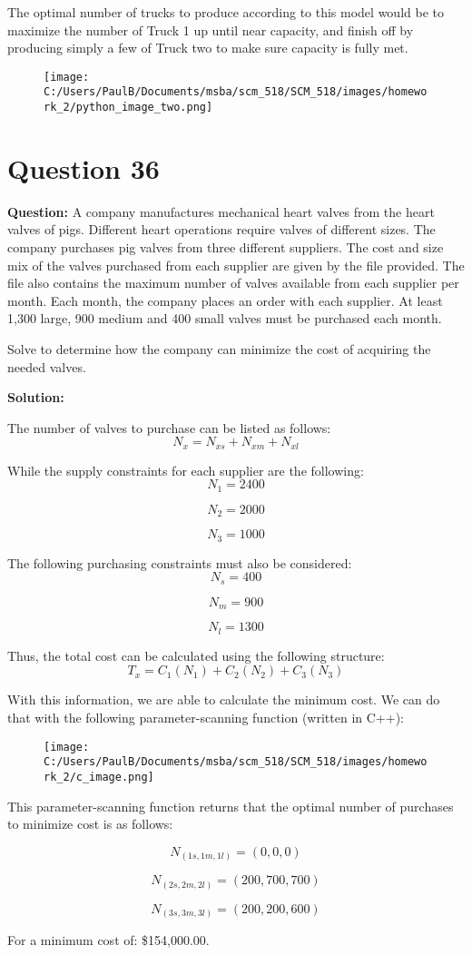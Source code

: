 \documentclass[notitlepage]{report}
\begin{document}
The optimal number of trucks to produce according to this model would be to maximize the number of Truck 1 up until near capacity, and finish off by producing simply a few of Truck two to make sure capacity is fully met.

\begin{figure}[H]
	\centering
	\texttt{[image: C:/Users/PaulB/Documents/msba/scm\_518/SCM\_518/images/homework\_2/python\_image\_two.png]}
\end{figure}

\section*{Question 36}
\textbf{Question:} A company manufactures mechanical heart valves from the heart valves of pigs. Different heart operations require valves of different sizes. The company purchases pig valves from three different suppliers. The cost and size mix of the valves purchased from each supplier are given by the file provided. The file also contains the maximum number of valves available from each supplier per month. Each month, the company places an order with each supplier. At least 1,300 large, 900 medium and 400 small valves must be purchased each month.

Solve to determine how the company can minimize the cost of acquiring the needed valves.

\textbf{Solution:}

The number of valves to purchase can be listed as follows:
$$
N_{x} = N_{xs}+N_{xm}+N_{xl}
$$

While the supply constraints for each supplier are the following:
$$
N_{1} = 2400
$$

$$
N_{2} = 2000
$$

$$
N_{3} = 1000
$$

The following purchasing constraints must also be considered:
$$
N_{s} = 400
$$

$$
N_{m} = 900
$$

$$
N_{l} = 1300
$$

Thus, the total cost can be calculated using the following structure:
$$
T_{x} = C_{1} (N_{1}) + C_{2} (N_{2}) + C_{3} (N_{3})
$$

With this information, we are able to calculate the minimum cost. We can do that with the following parameter-scanning function (written in C++):

\begin{figure}[H]
	\centering
	\texttt{[image: C:/Users/PaulB/Documents/msba/scm\_518/SCM\_518/images/homework\_2/c\_image.png]}
\end{figure}

This parameter-scanning function returns that the optimal number of purchases to minimize cost is as follows:

$$
N_{(1s, 1m, 1l)} = (0, 0, 0)
$$

$$
N_{(2s, 2m, 2l)} = (200, 700, 700)
$$

$$
N_{(3s, 3m, 3l)} = (200, 200, 600)
$$

For a minimum cost of: \$154,000.00.
\end{document}

